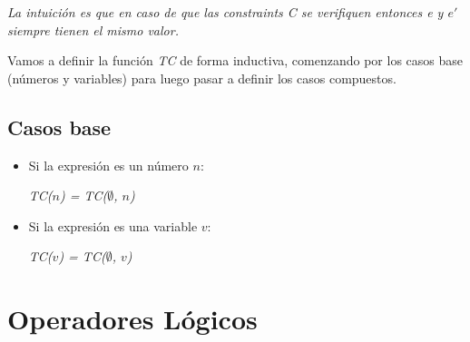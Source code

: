 \documentclass[a4paper,10pt]{article}
\begin{document}
	\vspace{0.2cm} 
	
	\noindent \textit{La intuición es que en caso de que las constraints C se verifiquen entonces e y $e'$ siempre tienen el mismo valor.} 
	
	\vspace{0.2cm} 
	
	\noindent Vamos a definir la función \textit{TC} de forma inductiva, comenzando por los casos base (números y variables) para luego pasar a definir los casos compuestos. 
	
	\subsection*{Casos base} 
	
	\begin{itemize} 
		\item Si la expresión es un número $n$:
		
			 \hspace{3em} \textit{TC($n$) = TC($\emptyset$, $n$)} 
			 
		\item Si la expresión es una variable $v$:
		
			 \hspace{3em} \textit{TC($v$) = TC($\emptyset$, $v$)}
	 \end{itemize}
	
	\section {Operadores Lógicos}
	
	\vspace{0.2cm}
	
\end{document}
